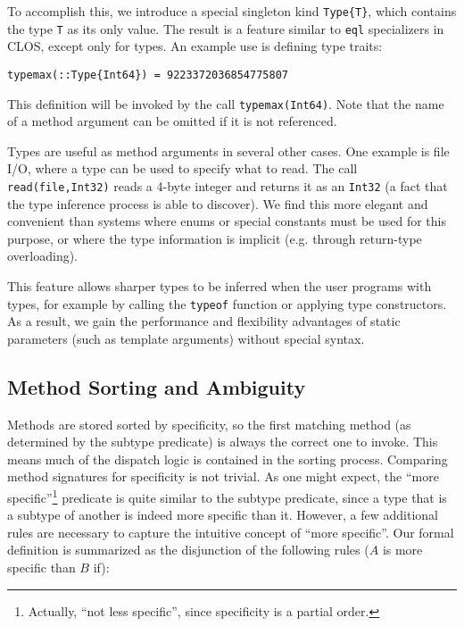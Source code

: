 \documentclass[9pt]{sigplanconf}
\begin{document}
To accomplish this, we introduce a special singleton kind {\tt Type\{T\}},
which contains the type {\tt T} as its only value.
The result is a feature similar to {\tt eql}
specializers in CLOS, except only for types. An example use is defining
type traits:

\begin{verbatim}
typemax(::Type{Int64}) = 9223372036854775807
\end{verbatim}

This definition will be invoked by the call {\tt typemax(Int64)}. Note that
the name of a method argument can be omitted if it is not referenced.

Types are useful as method arguments in several other cases. One example is
file I/O, where a type can be used to specify what to read. The call
{\tt read(file,Int32)} reads a 4-byte integer and returns it as an {\tt Int32}
(a fact that the type inference process is able to discover). We find this
more elegant and convenient than systems where enums or special constants must
be used for this purpose, or where the type information is implicit
(e.g. through return-type overloading).

This feature allows sharper types to be inferred when the user programs
with types, for example by calling the {\tt typeof} function or applying
type constructors. As a result, we gain the performance and flexibility
advantages of static parameters (such as template arguments) without special
syntax.

\subsection{Method Sorting and Ambiguity}
Methods are stored sorted by specificity, so the first matching method
(as determined by the subtype predicate) is always the correct one to invoke.
This means much of the dispatch logic is contained in the sorting process.
Comparing method signatures for specificity is not trivial. As one might
expect, the ``more specific''\footnote{Actually, ``not less specific'',
since specificity is a partial order.}
predicate is quite similar to the subtype
predicate, since a type that is a subtype of another is indeed more specific
than it. However, a few additional rules are necessary to capture the
intuitive concept of ``more specific''. Our formal definition is
summarized as the disjunction of the following rules ($A$ is more specific
than $B$ if):
\end{document}
